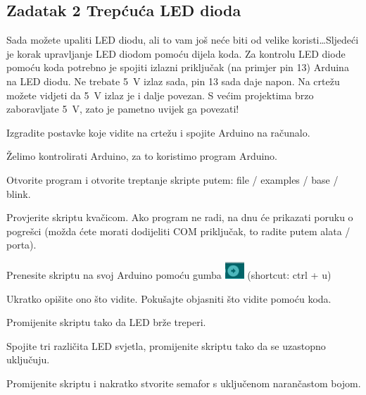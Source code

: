 \documentclass{arduino}
\begin{document}
\newpage
\subsection{Zadatak 2 Trepćuća LED dioda}


Sada možete upaliti LED diodu, ali to vam još neće biti od velike koristi\dots Sljedeći je korak upravljanje LED diodom pomoću dijela koda. Za kontrolu LED diode pomoću koda potrebno je spojiti izlazni priključak (na primjer pin 13) Arduina na LED diodu. Ne trebate \SI{5}{\volt} izlaz sada, pin 13 sada daje napon. Na crtežu možete vidjeti da \SI{5}{\volt} izlaz je i dalje povezan. S većim projektima brzo zaboravljate \SI{5}{\volt}, zato je pametno uvijek ga povezati!

\begin{alphalist}
\item Izgradite postavke koje vidite na crtežu i spojite Arduino na računalo.
\end{alphalist}

Želimo kontrolirati Arduino, za to koristimo program Arduino.

\begin{alphalist}
\item Otvorite program i otvorite treptanje skripte putem: file / examples / base / blink.

\item Provjerite skriptu kvačicom. Ako program ne radi, na dnu će prikazati poruku o pogrešci (možda ćete morati dodijeliti COM priključak, to radite putem alata / porta).

\item Prenesite skriptu na svoj Arduino pomoću gumba \includegraphics{10. Arduino upload} (shortcut: ctrl + u)

\item Ukratko opišite ono što vidite. Pokušajte objasniti što vidite pomoću koda.

\item Promijenite skriptu tako da LED brže treperi.

\item Spojite tri različita LED svjetla, promijenite skriptu tako da se uzastopno uključuju.

\item Promijenite skriptu i nakratko stvorite semafor s uključenom narančastom bojom.
\end{alphalist}
\end{document}

